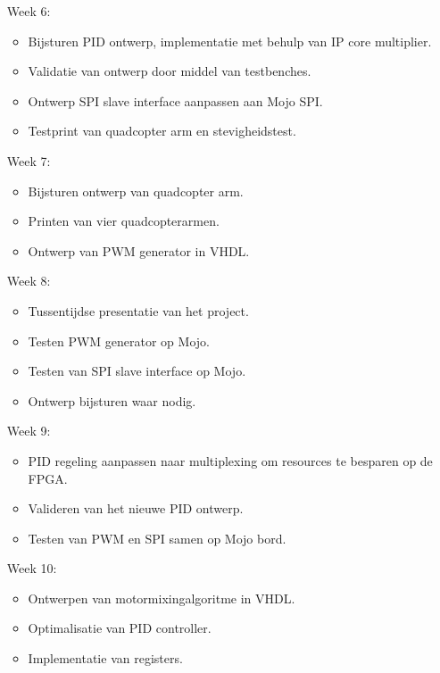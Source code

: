 \begin{itemize}
\begin{itemize}
					\end{itemize}					

				\item[Week 6:]
					\begin{itemize}
						\item Bijsturen PID ontwerp, implementatie met behulp van IP core multiplier.
						\item Validatie van ontwerp door middel van testbenches.
						\item Ontwerp SPI slave interface aanpassen aan Mojo SPI.
						\item Testprint van quadcopter arm en stevigheidstest.
					\end{itemize}					

				\item[Week 7:]
					\begin{itemize}
						\item Bijsturen ontwerp van quadcopter arm.
						\item Printen van vier quadcopterarmen.
						\item Ontwerp van PWM generator in VHDL.
					\end{itemize}					

				\item[Week 8:]
					\begin{itemize}
						\item Tussentijdse presentatie van het project.
						\item Testen PWM generator op Mojo. 
						\item Testen van SPI slave interface op Mojo. 
						\item Ontwerp bijsturen waar nodig.
					\end{itemize}					

				\item[Week 9:]
					\begin{itemize}
						\item PID regeling aanpassen naar multiplexing om resources te besparen op de FPGA.
						\item Valideren van het nieuwe PID ontwerp.
						\item Testen van PWM en SPI samen op Mojo bord.
					\end{itemize}					

				\item[Week 10:]
					\begin{itemize}
						\item Ontwerpen van motormixingalgoritme in VHDL.
						\item Optimalisatie van PID controller.
						\item Implementatie van registers.
					\end{itemize}					


\end{itemize}
